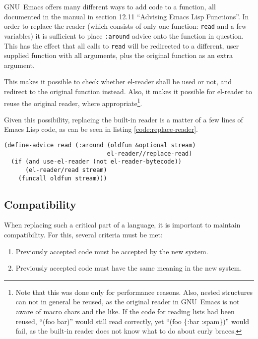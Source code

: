 \documentclass[a4paper,10pt,twoside]{article}
\newcommand{\el}{Emacs Lisp}
\newcommand{\elr}{el-reader}
\newcommand{\sym}[1]{\texttt{#1}}
\newcommand{\fun}[1]{\texttt{#1}}
\newcommand{\emacs}{GNU~Emacs}
\begin{document}
\emacs{} offers many different ways to add code to a function, all documented in
the manual in section 12.11 ``Advising Emacs Lisp
Functions''\cite{elisp-reference}.  In order to replace the reader (which
consists of only one function: \fun{read} and a few variables) it is sufficient
to place \sym{:around} advice onto the function in question.  This has the
effect that all calls to \fun{read} will be redirected to a different, user
supplied function with all arguments, plus the original function as an extra
argument.

This makes it possible to check whether \elr{} shall be used or not, and
redirect to the original function instead.  Also, it makes it possible for
\elr{} to reuse the original reader, where appropriate\footnote{Note that this
  was done only for performance reasons.  Also, nested structures can not in
  general be reused, as the original reader in \emacs{} is not aware of macro
  chars and the like.  If the code for reading lists had been reused, ``(foo
  bar)'' would still read correctly, yet ``(foo \{:bar :spam\})'' would fail, as
  the built-in reader does not know what to do about curly braces.}.

Given this possibility, replacing the built-in reader is a matter of a few lines
of \el{} code, as can be seen in listing \ref{code:replace-reader}.

\begin{lstlisting}[style=lispcode,caption={Replacing the built-in
    reader},label={code:replace-reader}]
(define-advice read (:around (oldfun &optional stream)
                             el-reader//replace-read)
  (if (and use-el-reader (not el-reader-bytecode))
      (el-reader/read stream)
    (funcall oldfun stream)))
\end{lstlisting}

\subsection{Compatibility}
\label{subsec:compat}

When replacing such a critical part of a language, it is important to maintain
compatibility.  For this, several criteria must be met:

\begin{enumerate}
\item Previously accepted code must be accepted by the new system.
\item Previously accepted code must have the same meaning in the new system.
\end{enumerate}
\end{document}
